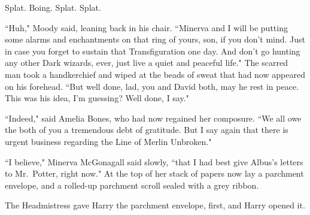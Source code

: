 Splat. Boing. Splat. Splat.

``Huh," Moody said, leaning back in his chair. ``Minerva and I will be putting some alarms and enchantments on that ring of yours, son, if you don't mind. Just in case you forget to sustain that Transfiguration one day. And don't go hunting any other Dark wizards, ever, just live a quiet and peaceful life." The scarred man took a handkerchief and wiped at the beads of sweat that had now appeared on his forehead. ``But well done, lad, you and David both, may he rest in peace. This was his idea, I'm guessing? Well done, I say."

``Indeed," said Amelia Bones, who had now regained her composure. ``We all owe the both of you a tremendous debt of gratitude. But I say again that there is urgent business regarding the Line of Merlin Unbroken."

``I believe," Minerva McGonagall said slowly, ``that I had best give Albus's letters to Mr.~Potter, right now." At the top of her stack of papers now lay a parchment envelope, and a rolled-up parchment scroll sealed with a grey ribbon.

The Headmistress gave Harry the parchment envelope, first, and Harry opened it.

\later

